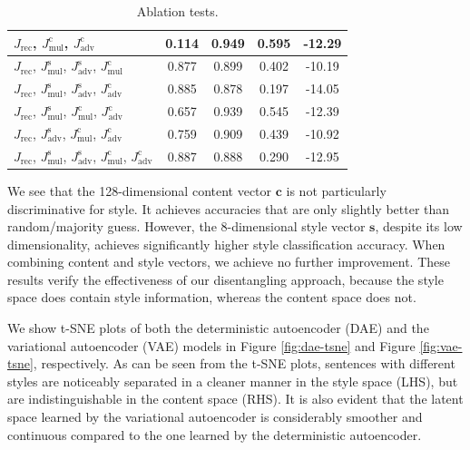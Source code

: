 \documentclass[letterpaper]{article} %
\newcommand{\loss}[2]{J_{\text{#1}}^{\text{#2}}}
\begin{document}
\begin{table}[ht]
\begin{tabular}{| l || c | c | c | c |}
		\hline
		$\loss{rec}{}$, $\loss{mul}{c}$, $\loss{adv}{c}$                                   & 0.114           & 0.949               & 0.595          & -12.29          \\
		\hline
		$\loss{rec}{}$, $\loss{mul}{s}$, $\loss{adv}{s}$, $\loss{mul}{c}$                  & 0.877           & 0.899               & 0.402          & -10.19          \\
		\hline
		$\loss{rec}{}$, $\loss{mul}{s}$, $\loss{adv}{s}$, $\loss{adv}{c}$                  & 0.885           & 0.878               & 0.197          & -14.05          \\
		\hline
		$\loss{rec}{}$, $\loss{mul}{s}$, $\loss{mul}{c}$, $\loss{adv}{c}$                  & 0.657           & 0.939               & 0.545          & -12.39          \\
		\hline
		$\loss{rec}{}$, $\loss{adv}{s}$, $\loss{mul}{c}$, $\loss{adv}{c}$                  & 0.759           & 0.909               & 0.439          & -10.92          \\
		\hline
		$\loss{rec}{}$, $\loss{mul}{s}$, $\loss{adv}{s}$, $\loss{mul}{c}$, $\loss{adv}{c}$ & 0.887           & 0.888               & 0.290          & -12.95          \\
		\hline
	\end{tabular}
	\caption{Ablation tests.}
	\label{tab:ablation-results}
\end{table}

We see that the 128-dimensional content vector $\bm c$ is not particularly discriminative for style.
It achieves accuracies that are only slightly better than random/majority guess.
However, the 8-dimensional style vector $\bm s$, despite its low dimensionality, achieves significantly higher style classification accuracy.
When combining content and style vectors, we achieve no further improvement.
These results verify the effectiveness of our disentangling approach, because the style space does contain style information, whereas the content space does not.

We show t-SNE plots of both the deterministic autoencoder (DAE) and the variational autoencoder (VAE) models in Figure \ref{fig:dae-tsne} and Figure \ref{fig:vae-tsne}, respectively.
As can be seen from the t-SNE plots, sentences with different styles are noticeably separated in a cleaner manner in the style space (LHS), but are indistinguishable in the content space (RHS).
It is also evident that the latent space learned by the variational autoencoder is considerably smoother and continuous compared to the one learned by the deterministic autoencoder.
\end{document}
